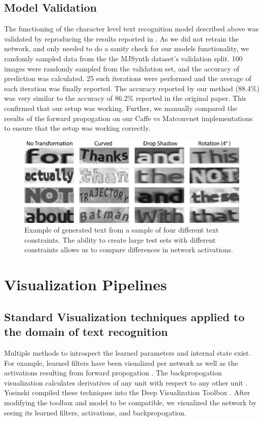 \documentclass[10pt,twocolumn,letterpaper]{article}
\begin{document}
\subsection{Model Validation}
The functioning of the character level text recognition model described above was validated by reproducing the results reported in \cite{Jaderberg14c}. As we did not retrain the network, and only needed to do a sanity check for our models functionality, we randomly sampled data from the the MJSynth dataset's validation split. 100 images were randomly sampled from the validation set, and the accuracy of prediction was calculated. 25 such iterations were performed and the average of each iteration was finally reported. The accuracy reported by our method (88.4$\%$) was very similar to the accuracy of 86.2$\%$ reported in the original paper. This confirmed that our setup was working. Further, we manually compared the results of the forward propogation on our Caffe vs Matconvnet implementations to ensure that the setup was working correctly.

\begin{figure}
\includegraphics[width=\columnwidth]{Figures/synthtext_outputs/synthext_outputs.png}
\caption{Example of generated text from a sample of four different text constraints. The ability to create large test sets with different constraints allows us to compare differences in network activations.}
\label{fig:genText}
\end{figure}

\section{Visualization Pipelines}

\subsection{Standard Visualization techniques applied to the domain of text recognition}
Multiple methods to introspect the learned parameters and internal state exist. For example, learned filters have been visualized per network as well as the activations resulting from forward propogation \cite{yosinski2015understanding}. The backpropogation visualization calculates derivatives of any unit with respect to any other unit \cite{DBLP:journals/corr/ZeilerF13}. Yosinski compiled these techniques into the Deep Visualization Toolbox \cite{yosinski2015understanding}. After modifying the toolbox and model to be compatible, we visualized the network by seeing its learned filters, activations, and backpropogation.
\end{document}
